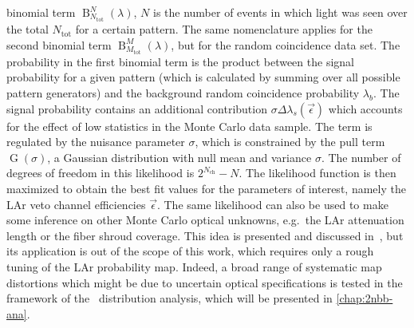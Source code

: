 binomial term $\operatorname{B}^N_{N_\text{tot}}(\lambda)$, $N$ is the number of events in
which light was seen over the total $N_\text{tot}$ for a certain pattern. The same
nomenclature applies for the second binomial term
$\operatorname{B}^M_{M_\text{tot}}(\lambda)$, but for the random coincidence data set.
The probability in the first binomial term is the product between the signal probability
for a given pattern (which is calculated by summing over all possible pattern generators)
and the background random coincidence probability $\lambda_b$. The signal probability
contains an additional contribution $\sigma \Delta\lambda_s(\vec{\epsilon})$ which
accounts for the effect of low statistics in the Monte Carlo data sample. The term is
regulated by the nuisance parameter $\sigma$, which is constrained by the pull term
$\operatorname{G}(\sigma)$, a Gaussian distribution with null mean and variance $\sigma$. The
number of degrees of freedom in this likelihood is $2^{N_\text{ch}}-N$.
\newpar
The likelihood function is then maximized to obtain the best fit values for the parameters
of interest, namely the LAr veto channel efficiencies $\vec{\epsilon}$. The same likelihood
can also be used to make some inference on other Monte Carlo optical unknowns,
e.g.~the LAr attenuation length or the fiber shroud coverage. This idea is presented and
discussed in~\cite{Wiesinger2021}, but its application is out of the scope of this work,
which requires only a rough tuning of the LAr probability map. Indeed, a broad range of
systematic map distortions which might be due to uncertain optical specifications is
tested in the framework of the \nnbb\ distribution analysis, which will be presented in
\cref{chap:2nbb-ana}.

